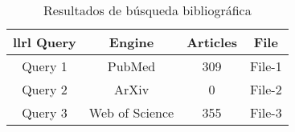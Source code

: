 \begin{table}[htbp]
\centering
\caption{Resultados de búsqueda bibliográfica}
\label{tab:resultados}
\begin{tabular}{|c|c|c|c|}{llrl}
\hline\hline
\textbf{Query} & \textbf{Engine} & \textbf{Articles} & \textbf{File} \\
\hline\hline
Query 1 & PubMed & 309 & File-1 \\
Query 2 & ArXiv & 0 & File-2 \\
Query 3 & Web of Science & 355 & File-3 \\
\hline
\hline
\end{tabular}
\end{table}
